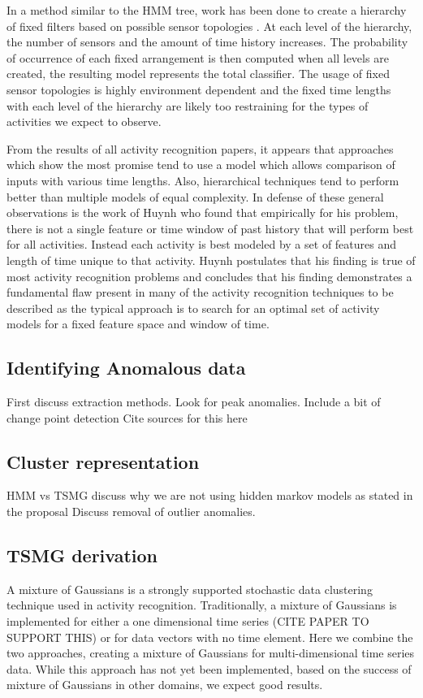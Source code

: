 In a method similar to the HMM tree, work has been done to create a hierarchy of fixed filters based on possible sensor topologies \cite{Wren2006}.  At each level of the hierarchy, the number of sensors and the amount of time history increases.  The probability of occurrence of each fixed arrangement is then computed when all levels are created, the resulting model represents the total classifier.  The usage of fixed sensor topologies is highly environment dependent and the fixed time lengths with each level of the hierarchy are likely too restraining for the types of activities we expect to observe.  

From the results of all activity recognition papers, it appears that approaches which show the most promise tend to use a model which allows comparison of inputs with various time lengths.  Also, hierarchical techniques tend to perform better than multiple models of equal complexity.  In defense of these general observations is the work of Huynh \cite{Huynh2005} who found that empirically for his problem, there is not a single feature or time window of past history that will perform best for all activities.  Instead each activity is best modeled by a set of features and length of time unique to that activity.  Huynh postulates that his finding is true of most activity recognition problems and concludes that his finding demonstrates a fundamental flaw present in many of the activity recognition techniques to be described as the typical approach is to search for an optimal set of activity models for a fixed feature space and window of time.


\subsection{Identifying Anomalous data}
First discuss extraction methods.  Look for peak anomalies.  
Include a bit of change point detection
Cite sources for this here



\subsection{Cluster representation}
HMM vs TSMG
discuss why we are not using hidden markov models as stated in the proposal
Discuss removal of outlier anomalies.

\subsection{TSMG derivation}
A mixture of Gaussians is a strongly supported stochastic data clustering technique used in activity recognition.  Traditionally, a mixture of Gaussians is implemented for either a one dimensional time series (CITE PAPER TO SUPPORT THIS) or for data vectors with no time element.  Here we combine the two approaches, creating a mixture of Gaussians for multi-dimensional time series data.  While this approach has not yet been implemented, based on the success of mixture of Gaussians in other domains, we expect good results.

